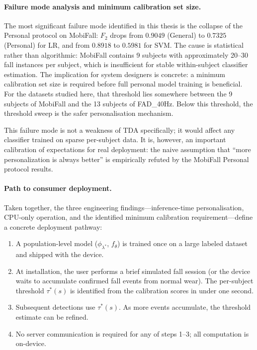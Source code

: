 \documentclass[onluarkali,ingilizce,yukseklisans,karton,LisansustuEgitim]{itutez}
\providecommand{\1}{\mathbf{1}}
\begin{document}
\paragraph{Failure mode analysis and minimum calibration set size.}
The most significant failure mode identified in this thesis is the collapse of
the Personal protocol on MobiFall: $F_2$ drops from $0.9049$ (General) to
$0.7325$ (Personal) for LR, and from $0.8918$ to $0.5981$ for SVM.  The cause is
statistical rather than algorithmic: MobiFall contains 9 subjects with
approximately 20--30 fall instances per subject, which is insufficient for stable
within-subject classifier estimation.  The implication for system designers is
concrete: a minimum calibration set size is required before full personal model
training is beneficial.  For the datasets studied here, that threshold lies somewhere
between the 9 subjects of MobiFall and the 13 subjects of FAD\_40Hz.  Below this
threshold, the threshold sweep is the safer personalisation mechanism.

This failure mode is not a weakness of TDA specifically; it would affect any
classifier trained on sparse per-subject data.  It is, however, an important
calibration of expectations for real deployment: the naive assumption that
``more personalization is always better'' is empirically refuted by the MobiFall
Personal protocol results.

\paragraph{Path to consumer deployment.}
Taken together, the three engineering findings---inference-time personalisation,
CPU-only operation, and the identified minimum calibration requirement---define a
concrete deployment pathway:

\begin{enumerate}
  \item A population-level model ($\phi_{\lambda^*}$, $f_\theta$) is trained once
    on a large labeled dataset and shipped with the device.
  \item At installation, the user performs a brief simulated fall session
    (or the device waits to accumulate confirmed fall events from normal wear).
    The per-subject threshold $\tau^*(s)$ is identified from the calibration
    scores in under one second.
  \item Subsequent detections use $\tau^*(s)$.  As more events accumulate, the
    threshold estimate can be refined.
  \item No server communication is required for any of steps 1--3; all computation
    is on-device.
\end{enumerate}
\end{document}
